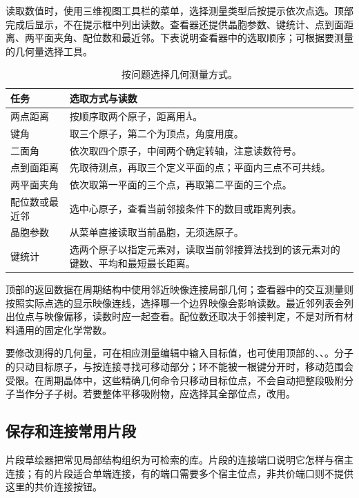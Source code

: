 读取数值时，使用三维视图工具栏的菜单，选择测量类型后按提示依次点选。顶部完成后显示，不在提示框中列出读数。查看器还提供晶胞参数、键统计、点到面距离、两平面夹角、配位数和最近邻。下表说明查看器中的选取顺序；可根据要测量的几何量选择工具。

\begin{table}[htbp]
\centering\small
\begin{tabularx}{\linewidth}{lX}
\toprule
任务 & 选取方式与读数 \\
\midrule
两点距离 & 按顺序取两个原子，距离用\AA。 \\
键角 & 取三个原子，第二个为顶点，角度用度。 \\
二面角 & 依次取四个原子，中间两个确定转轴，注意读数符号。 \\
点到面距离 & 先取待测点，再取三个定义平面的点；平面内三点不可共线。 \\
两平面夹角 & 依次取第一平面的三个点，再取第二平面的三个点。 \\
配位数或最近邻 & 选中心原子，查看当前邻接条件下的数目或距离列表。 \\
晶胞参数 & 从菜单直接读取当前晶胞，无须选原子。 \\
键统计 & 选两个原子以指定元素对，读取当前邻接算法找到的该元素对的键数、平均和最短最长距离。 \\
\bottomrule
\end{tabularx}
\caption{按问题选择几何测量方式。}
\end{table}

顶部的返回数据在周期结构中使用邻近映像连接局部几何；查看器中的交互测量则按照实际点选的显示映像连线，选择哪一个边界映像会影响读数。最近邻列表会列出位点与映像偏移，读数时应一起查看。配位数还取决于邻接判定，不是对所有材料通用的固定化学常数。

要修改测得的几何量，可在相应测量编辑中输入目标值，也可使用顶部的、、。分子的只动目标原子，与按连接寻找可移动部分；环不能被一根键分开时，移动范围会受限。在周期晶体中，这些精确几何命令只移动目标位点，不会自动把整段吸附分子当作分子子树。若要整体平移吸附物，应选择其全部位点，改用。

\subsection{保存和连接常用片段}\label{sec:fragment-library-reference}

片段草绘器把常见局部结构组织为可检索的库。片段的连接端口说明它怎样与宿主连接；有的片段适合单端连接，有的端口需要多个宿主位点，非共价端口则不提供这里的共价连接按钮。

